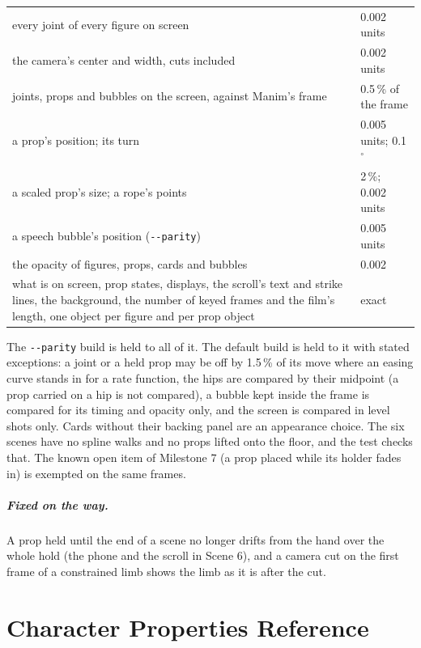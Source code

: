 \documentclass[
  12pt,
  letterpaper,
]{book}
\begin{document}
\begin{center}
\begin{tabular}{p{3.6in}l}
\hline
every joint of every figure on screen & 0.002 units \\
the camera's center and width, cuts included & 0.002 units \\
joints, props and bubbles on the screen, against Manim's frame &
0.5\,\% of the frame \\
a prop's position; its turn & 0.005 units; 0.1$^\circ$ \\
a scaled prop's size; a rope's points & 2\,\%; 0.002 units \\
a speech bubble's position (\texttt{-{}-parity}) & 0.005 units \\
the opacity of figures, props, cards and bubbles & 0.002 \\
what is on screen, prop states, displays, the scroll's text and strike
lines, the background, the number of keyed frames and the film's
length, one object per figure and per prop object & exact \\
\hline
\end{tabular}
\end{center}

The \texttt{-{}-parity} build is held to all of it. The default build
is held to it with stated exceptions: a joint or a held prop may be off
by 1.5\,\% of its move where an easing curve stands in for a rate
function, the hips are compared by their midpoint (a prop carried on a
hip is not compared), a bubble kept inside the frame is compared for
its timing and opacity only, and the screen is compared in level shots
only. Cards without their backing panel are an appearance choice. The
six scenes have no spline walks and no props lifted onto the floor, and
the test checks that. The known open item of Milestone 7 (a prop placed
while its holder fades in) is exempted on the same frames.

\paragraph{Fixed on the way.} A prop held until the end of a scene no
longer drifts from the hand over the whole hold (the phone and the
scroll in Scene 6), and a camera cut on the first frame of a
constrained limb shows the limb as it is after the cut.

\chapter{Character Properties
Reference}\label{character-properties-reference}
\end{document}
